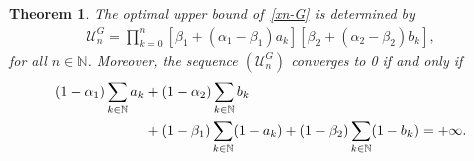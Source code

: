 \documentclass[a4paper, 11pt]{article}
\newtheorem{theorem}{Theorem}[section]
\begin{document}
\begin{theorem}\label{theo-U-G}
The optimal upper bound of~\eqref{xn-G} is determined by
\begin{align}\label{Un-G}
\mathcal{U}_n^{G}=\prod_{k=0}^n {[\beta_1+(\alpha_1 - \beta_1)a_k][\beta_2+(\alpha_2-\beta_2)b_k]},
\end{align}
for all $n \in \mathbb{N}$. Moreover, the sequence $(\mathcal{U}_n^G)$ converges to 0 if and only if
\begin{align}\label{iff-Un-G}
(1-\alpha_1)\sum_{k \in \mathbb{N}} a_k & + (1-\alpha_2)\sum_{k \in \mathbb{N}} b_k \notag \\
& + (1-\beta_1) \sum_{k \in \mathbb{N}} (1 - a_k) + (1-\beta_2)\sum_{k \in \mathbb{N}} (1- b_k) = +\infty. 
\end{align}
\end{theorem}
\end{document}
